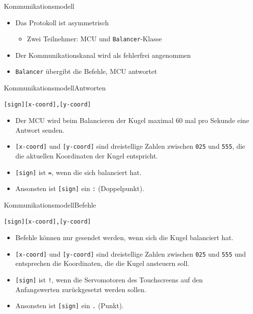 \documentclass{beamer}
\begin{document}
\begin{frame}[fragile,t]{Kommunikationsmodell}
\begin{itemize}
\item Das Protokoll ist asymmetrisch
\begin{itemize}
\item Zwei Teilnehmer: MCU und \verb~Balancer~-Klasse
\end{itemize}
\item Der Kommunikationskanal wird als fehlerfrei angenommen
\item \verb~Balancer~ übergibt die Befehle, MCU antwortet
\end{itemize}
\end{frame}

\begin{frame}[fragile,t]{Kommunikationsmodell}{Antworten}
\begin{verbatim}
[sign][x-coord],[y-coord]
\end{verbatim}

\begin{itemize}
\item Der MCU wird beim Balancieren der Kugel maximal 60 mal pro Sekunde eine Antwort senden.
\item \texttt{[x-coord]} und \texttt{[y-coord]} sind dreistellige Zahlen zwischen \texttt{025} und \texttt{555}, die die aktuellen Koordinaten der Kugel entspricht.
\item \texttt{[sign]} ist \texttt{=}, wenn die sich balanciert hat.
\item Ansonsten ist \texttt{[sign]} ein \texttt{:} (Doppelpunkt).
\end{itemize}
\end{frame}

\begin{frame}[fragile,t]{Kommunikationsmodell}{Befehle}
\begin{verbatim}
[sign][x-coord],[y-coord]
\end{verbatim}

\begin{itemize}
\item Befehle können nur gesendet werden, wenn sich die Kugel balanciert hat.
\item \texttt{[x-coord]} und \texttt{[y-coord]} sind dreistellige Zahlen zwischen \texttt{025} und \texttt{555} und entsprechen die Koordinaten, die die Kugel ansteuern soll.
\item \texttt{[sign]} ist \texttt{!}, wenn die Servomotoren des Touchscreens auf den Anfangswerten zurückgesetzt werden sollen.
\item Ansonsten ist \texttt{[sign]} ein \texttt{.} (Punkt).
\end{itemize}
\end{frame}
\end{document}
